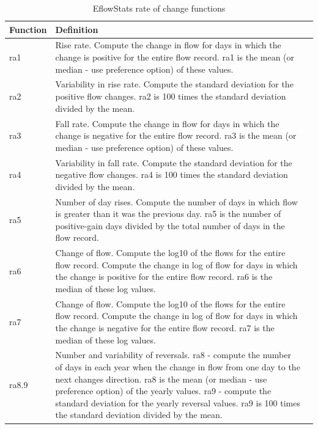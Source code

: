 \documentclass[a4paper,11pt]{article}\usepackage[]{graphicx}\usepackage[]{color}
\begin{document}
\begin{table}[ht]
  \centering
  \begin{threeparttable}[b]
  \caption{EflowStats rate of change functions}
  \label{tab:rateStats}
\begin{tabularx}{\textwidth}{lXl}
  \hline
\textbf{Function} & \textbf{Definition} \\ 
  \hline
  ra1 & Rise rate. Compute the change in flow for days in which the change is positive for the entire flow record. ra1 is the mean (or median - use preference option) of these values. \\
  ra2 & Variability in rise rate. Compute the standard deviation for the positive flow changes. ra2 is 100 times the standard deviation divided by the mean. \\
  ra3 & Fall rate. Compute the change in flow for days in which the change is negative for the entire flow record. ra3 is the mean (or median - use preference option) of these values. \\
  ra4 & Variability in fall rate. Compute the standard deviation for the negative flow changes. ra4 is 100 times the standard deviation divided by the mean. \\
  ra5 & Number of day rises. Compute the number of days in which flow is greater than it was the previous day. ra5 is the number of positive-gain days divided by the total number of days in the flow record. \\
  ra6 & Change of flow. Compute the log10 of the flows for the entire flow record. Compute the change in log of flow for days in which the change is positive for the entire flow record. ra6 is the median of these log values. \\
  ra7 & Change of flow. Compute the log10 of the flows for the entire flow record. Compute the change in log of flow for days in which the change is negative for the entire flow record. ra7 is the median of these log values. \\
  ra8.9 & Number and variability of reversals. ra8 - compute the number of days in each year when the change in flow from one day to the next changes direction. ra8 is the mean (or median - use preference option) of the yearly values. ra9 - compute the standard deviation for the yearly reversal values. ra9 is 100 times the standard deviation divided by the mean. \\
   \hline
\end{tabularx}
\end{threeparttable}
\end{table}
\end{document}
